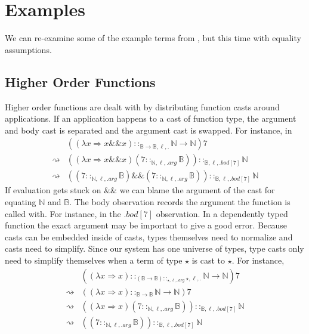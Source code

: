\section{Examples}
We can re-examine some of the example terms from , but this time with equality assumptions.
 
\subsection{Higher Order Functions}
 
Higher order functions are dealt with by distributing function casts around applications.
If an application happens to a cast of function type, the argument and body cast is separated and the argument cast is swapped.
For instance, in
\begin{align*}
\, & \left(\left(\lambda x\Rightarrow x\&\&x\right)::_{\mathbb{B}\rightarrow\mathbb{B},\ell,.}\mathbb{N}\rightarrow\mathbb{N}\right)7\\
\rightsquigarrow & \left(\left(\lambda x\Rightarrow x\&\&x\right)\left(7::_{\mathbb{N},\ell,.arg}\mathbb{B}\right)\right)::_{\mathbb{B},\ell,.bod[7]}\mathbb{N}\\
\rightsquigarrow & \left(\left(7::_{\mathbb{N},\ell,.arg}\mathbb{B}\right)\&\&\left(7::_{\mathbb{N},\ell,.arg}\mathbb{B}\right)\right) ::_{\mathbb{B},\ell,.bod[7]}\mathbb{N}
\end{align*}
If evaluation gets stuck on $\&\&$ we can blame the argument of the cast for equating $\mathbb{N}$ and $\mathbb{B}$.
The body observation records the argument the function is called with.
For instance, in the $.bod[7]$ observation.
In a dependently typed function the exact argument may be important to give a good error.
Because casts can be embedded inside of casts, types themselves need to normalize and casts need to simplify.
Since our system has one universe of types, type casts only need to simplify themselves when a term of type $\star$ is cast to $\star$.
For instance,
\begin{align*}
\, & \left(\left(\lambda x\Rightarrow x\right)::_{\left(\mathbb{B}\rightarrow\mathbb{B}\right)::_{\star,\ell,.arg}\star,\ell,.}\mathbb{N}\rightarrow\mathbb{N}\right)7\\
\rightsquigarrow & \left(\left(\lambda x\Rightarrow x\right)::_{\mathbb{B}\rightarrow\mathbb{B}}\mathbb{N}\rightarrow\mathbb{N}\right)7\\
\rightsquigarrow & \left(\left(\lambda x\Rightarrow x\right)\left(7::_{\mathbb{N},\ell,.arg}\mathbb{B}\right)\right)::_{\mathbb{B},\ell,.bod[7]}\mathbb{N}\\
\rightsquigarrow & \left(\left(7::_{\mathbb{N},\ell,.arg}\mathbb{B}\right)\right)::_{\mathbb{B},\ell,.bod[7]}\mathbb{N}
\end{align*}
 
